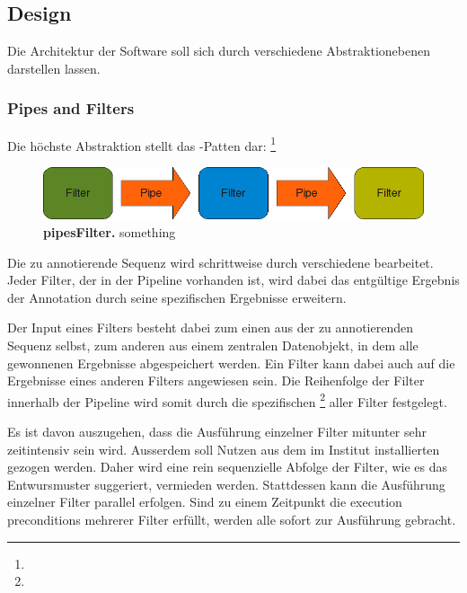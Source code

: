 \subsection{Design}
Die Architektur der Software soll sich durch verschiedene Abstraktionebenen
darstellen lassen. 

\subsubsection{Pipes and Filters}
Die höchste Abstraktion stellt das -Patten dar:
\footnote{}

\begin{figure}[htbp]
	\begin{center}
		\includegraphics[scale=0.7]{pics/pipesFilter3.png}
	\caption[Pipes and Filter]{
	\textbf{pipesFilter.}
	something}
	\end{center}
	\label{fig:pipesFilter}
\end{figure}

Die zu annotierende Sequenz wird schrittweise durch verschiedene 
bearbeitet. Jeder Filter, der in der Pipeline vorhanden ist, wird dabei das
entgültige Ergebnis der Annotation durch seine spezifischen Ergebnisse
erweitern.

Der Input eines Filters besteht dabei zum einen aus der zu
annotierenden Sequenz selbst, zum anderen aus einem zentralen Datenobjekt, in
dem alle gewonnenen Ergebnisse abgespeichert werden.
Ein Filter kann dabei auch auf die Ergebnisse eines anderen
Filters angewiesen sein. Die Reihenfolge der Filter innerhalb der Pipeline wird
somit durch die spezifischen 
\footnote{} aller Filter festgelegt.

Es ist davon auszugehen, dass die Ausführung einzelner Filter mitunter sehr
zeitintensiv sein wird. Ausserdem soll Nutzen aus dem im Institut installierten
 gezogen werden. Daher wird eine rein sequenzielle Abfolge der
Filter, wie es das Entwursmuster suggeriert, vermieden werden.
Stattdessen kann die Ausführung einzelner Filter parallel erfolgen.
Sind zu einem Zeitpunkt die execution preconditions mehrerer Filter erfüllt,
werden alle sofort zur Ausführung gebracht.

